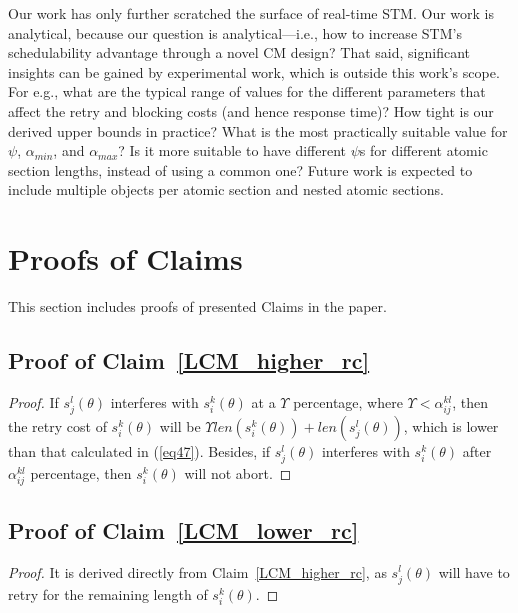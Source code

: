\documentclass[conference]{sig-alternate}
\begin{document}
Our work has only further scratched the surface of real-time STM. Our work is analytical, because our question is analytical---i.e., how to increase STM's schedulability advantage through a novel CM design? That said, significant insights can be gained by experimental work, which is outside this work's  scope. For e.g., what are the typical range of values for the different parameters that affect the retry and blocking costs (and hence response time)? How tight is our derived upper bounds in practice? 
What is the most practically suitable
value for $\psi$, $\alpha_{min}$, and $\alpha_{max}$? Is it more suitable to have different $\psi$s for different atomic section lengths, instead of using a common one? Future work is expected to include multiple objects per atomic section and nested atomic sections.


%
%




\appendix
\section{Proofs of Claims}
This section includes proofs of presented Claims in the paper.
\subsection{\label{proof_LCM_higher_rc}Proof of Claim~\ref{LCM_higher_rc}}
\begin{proof}
If $s_{j}^{l}(\theta)$ interferes with $s_{i}^{k}(\theta)$
at a $\Upsilon$ percentage, where $\Upsilon<\alpha_{ij}^{kl}$,
then the retry cost of $s_{i}^{k}(\theta)$ will be $\Upsilon len(s_{i}^{k}(\theta))+len(s_{j}^{l}(\theta))$, which is lower than that calculated in (\ref{eq47}). Besides, 
if $s_{j}^{l}(\theta)$ interferes with $s_{i}^{k}(\theta)$ after
$\alpha_{ij}^{kl}$ percentage, then $s_{i}^{k}(\theta)$ will not
abort.
\end{proof}

\subsection{\label{proof_LCM_lower_rc} Proof of Claim~\ref{LCM_lower_rc}}
\begin{proof}
It is derived directly from Claim~\ref{LCM_higher_rc}, as $s_j^l(\theta)$ will have to retry for the remaining length of $s_i^k(\theta)$.
\end{proof}
\end{document}
